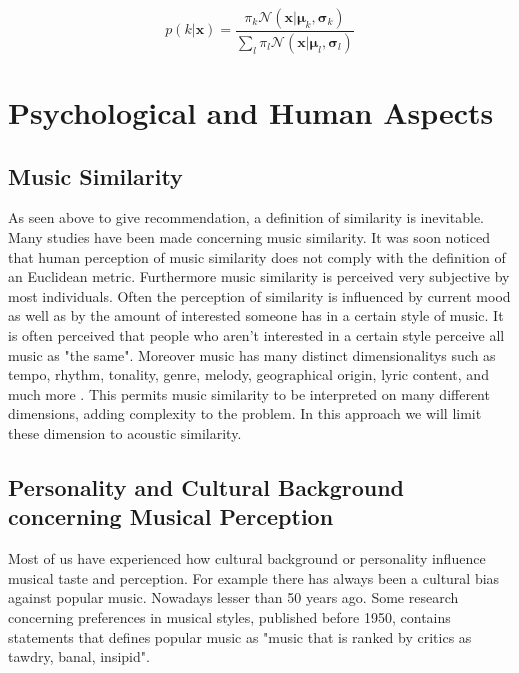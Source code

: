 \documentclass[cic,tc,english]{iiufrgs}
\begin{document}
\begin{equation}
p(k\vert \bm{x}) = \frac{\pi_k \mathcal{N}(\bm{x} \vert \bm{\mu}_k, \bm{\sigma}_k)}{\sum_l \pi_l \mathcal{N}(\bm{x} \vert \bm{\mu}_l, \bm{\sigma}_l)}
\end{equation}


\section{Psychological and Human Aspects}

\subsection{Music Similarity}
As seen above to give recommendation, a definition of similarity is inevitable. Many studies have been made concerning music similarity. It was soon noticed that human perception of music similarity does not comply with the definition of an Euclidean metric\cite{berenzweig2004large}. Furthermore music similarity is perceived very subjective by most individuals. Often the perception of similarity is influenced by current mood as well as by the amount of interested someone has in a certain style of music. It is often perceived that people who aren't interested in a certain style perceive all music as "the same". Moreover music has many distinct dimensionalitys such as tempo, rhythm, tonality, genre, melody, geographical origin, lyric content, and much more \cite{berenzweig2004large}. This permits music similarity to be interpreted on many different dimensions, adding complexity to the problem. In this approach we will limit these dimension to acoustic similarity.

\subsection{Personality and Cultural Background concerning Musical Perception}
Most of us have experienced how cultural background or personality influence musical taste and perception. For example there has always been a cultural bias against popular music. Nowadays lesser than 50 years ago. Some research concerning preferences in musical styles, published before 1950, contains statements that defines popular music as "music that is ranked by critics as tawdry, banal, insipid"\cite{gernet1940musical}.
\end{document}
